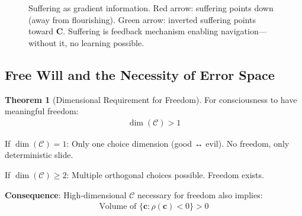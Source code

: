 \documentclass[11pt,a4paper]{article}
\theoremstyle{definition}
\newtheorem{theorem}{Theorem}[section]
\theoremstyle{remark}
\newcommand{\CC}{\mathcal{C}}
\newcommand{\cc}{\mathbf{c}}
\begin{document}
\begin{small}
\begin{enumerate}
\begin{figure}[H]
\caption{Suffering as gradient information. Red arrow: suffering points down (away from flourishing). Green arrow: inverted suffering points toward \(\mathbf{C}\). Suffering is feedback mechanism enabling navigation—without it, no learning possible.}
\label{fig:suffering_gradient}
\end{figure}

\subsection{Free Will and the Necessity of Error Space}

\begin{theorem}[Dimensional Requirement for Freedom]
For consciousness to have meaningful freedom:
\begin{align}
\dim(\CC) > 1
\end{align}

If \(\dim(\CC) = 1\): Only one choice dimension (good ↔ evil). No freedom, only deterministic slide.

If \(\dim(\CC) \geq 2\): Multiple orthogonal choices possible. Freedom exists.

\textbf{Consequence}: High-dimensional \(\CC\) necessary for freedom also implies:
\begin{align}
\text{Volume of } \{\cc : \rho(\cc) < 0\} > 0
\end{align}


\end{theorem}
\end{enumerate}
\end{small}
\end{document}
